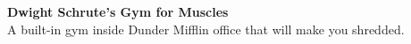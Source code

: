 {\textbf{Dwight Schrute's Gym for Muscles}}\\
A built-in gym inside Dunder Mifflin office that will make you shredded.\\
\vspace*{2mm}